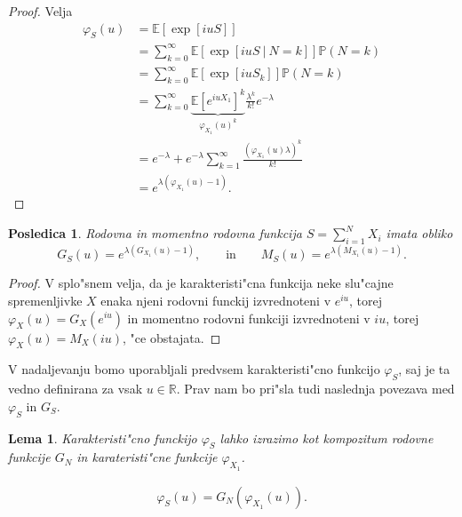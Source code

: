 \documentclass[12pt, a4paper, reqno]{amsart}
\theoremstyle{definition}
\theoremstyle{plain}
\newtheorem{lema}[definicija]{Lema}
\newtheorem{posledica}[definicija]{Posledica}
\newcommand{\R}{\mathbb{R}}
\newcommand{\E}{\mathbb{E}}
\newcommand{\Prob}{\mathbb{P}}
\newcommand{\1}{\mathds{1}}
\begin{document}
    \begin{proof}
        Velja
        \begin{align}
            \varphi_{S}(u) 
                    &= \E\left[\exp\left[iuS\right]\right] \nonumber\\
                    &= \sum_{k=0}^{\infty}
                        \E\left[\exp\left[iuS \ \big| \ N=k\right]\right]\Prob\left(N = k\right) \nonumber \\ 
                    &= \sum_{k=0}^{\infty}
                        \E\left[\exp\left[iuS_k\right]\right]\Prob\left(N = k\right) \nonumber \\
                    &= \sum_{k=0}^{\infty}
                        \underbrace{\E\left[e^{iuX_1}\right]^k}_{\varphi_{X_1}(u)^k}\frac{\lambda^k}{k!}e^{-\lambda } \label{eq:MomentS}\\ 
                    &= e^{-\lambda } + e^{-\lambda }\sum_{k=1}^\infty\frac{\left(\varphi_{X_1}(u)\lambda \right)^k}{k!} \nonumber \\
                    &= e^{\lambda \left(\varphi_{X_1}(u) - 1\right)}. \nonumber
        \end{align}
    \end{proof}
    
    \begin{posledica}
        Rodovna in momentno rodovna funkcija $S=\sum_{i = 1}^{N}X_i$ imata obliko 
    \begin{equation*}
        G_{S}(u) = e^{\lambda \left(G_{X_1}(u) - 1\right)}, \qquad \text{in} \qquad
        M_{S}(u) = e^{\lambda \left(M_{X_1}(u) - 1\right)}.
    \end{equation*}
    \end{posledica}

    \begin{proof}
    V splo"snem velja, da je karakteristi"cna funkcija neke slu"cajne spremenljivke $X$ enaka
    njeni rodovni funckij izvrednoteni v $e^{iu}$, torej $\varphi_X(u) = G_X(e^{iu})$ in momentno rodovni 
    funkciji izvrednoteni v $iu$, torej $\varphi_X(u) = M_X(iu)$, "ce obstajata.
    \end{proof}

    V nadaljevanju bomo uporabljali predvsem karakteristi"cno funkcijo $\varphi_S$, saj je ta vedno definirana 
    za vsak $u\in\R$. Prav nam bo pri"sla tudi naslednja povezava med $\varphi_S$ in $G_S$. 

    \begin{lema}
        Karakteristi"cno funckijo $\varphi_S$ lahko izrazimo kot kompozitum rodovne funkcije $G_N$ in 
        karateristi"cne funkcije $\varphi_{X_1}$.

        \begin{align*}
            \varphi_{S}(u) = G_{N}\left(\varphi_{X_1}(u)\right).
        \end{align*}

        \label{lema:povezavaRodovneKarkateristicne}
    \end{lema}
\end{document}
